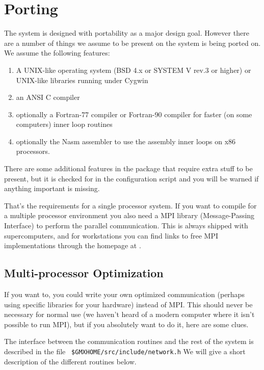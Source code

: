 \section{Porting {\gromacs}}
The {\gromacs} system is designed with portability as a major design
goal. However there are a number of things we assume to be present on
the system {\gromacs} is being ported on. We assume the following
features:

\begin{enumerate}
\item   A UNIX-like operating system (BSD 4.x or SYSTEM V rev.3 or higher) 
        or UNIX-like libraries running under {\eg} Cygwin
\item   an ANSI C compiler 
\item   optionally a Fortran-77 compiler or Fortran-90 compiler
        for faster (on some computers) inner loop routines
\item   optionally the Nasm assembler to use the assembly inner loops
        on x86 processors.
\end{enumerate}

There are some additional features in the package that require extra
stuff to be present, but it is checked for in the configuration script
and you will be warned if anything important is missing.

That's the requirements for a single processor system. If you want
to compile {\gromacs} for a multiple processor environment you also
need a MPI library (Message-Passing Interface) to perform the 
parallel communication. This is always shipped with supercomputers, and
for workstations you can find links to free MPI implementations through
the {\gromacs} homepage at {\wwwpage}.

\subsection{Multi-processor Optimization}

If you want to, you could write your own optimized communication
(perhaps using specific libraries for your hardware) instead
of MPI. This should never be necessary for normal use
(we haven't heard of a modern computer where it isn't possible
to run MPI), but if you absolutely want to do it, here are some clues.

The interface between the communication routines and the
rest of the {\gromacs} system is described in the file {\tt
\$GMXHOME/src/include/network.h} We will give a short description of the
different routines below.


